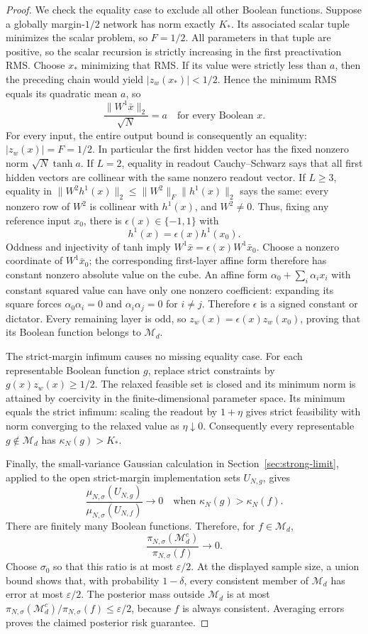 \begin{proof}
We check the equality case to exclude all other Boolean functions.
Suppose a globally margin-$1/2$ network has norm exactly $K_*$.
Its associated scalar tuple minimizes the scalar problem, so $F=1/2$.
All parameters in that tuple are positive, so the scalar recursion is strictly
increasing in the first preactivation RMS.
Choose $x_*$ minimizing that RMS. If its value were strictly less than $a$,
then the preceding chain would yield $|z_w(x_*)|<1/2$.
Hence the minimum RMS equals its quadratic mean $a$, so
\[
 \frac{\|W^1\bar x\|_2}{\sqrt N}=a
 \quad\text{for every Boolean }x.
\]
For every input, the entire output bound is consequently an equality:
$|z_w(x)|=F=1/2$. In particular the first hidden vector has the fixed nonzero
norm $\sqrt N\tanh a$.
If $L=2$, equality in readout Cauchy--Schwarz says that all first hidden
vectors are collinear with the same nonzero readout vector.
If $L\ge3$, equality in
$\|W^2h^1(x)\|_2\le\|W^2\|_F\|h^1(x)\|_2$ says the same: every nonzero row
of $W^2$ is collinear with $h^1(x)$, and $W^2\ne0$.
Thus, fixing any reference input $x_0$, there is
$\epsilon(x)\in\{-1,1\}$ with
\[
 h^1(x)=\epsilon(x)h^1(x_0).
\]
Oddness and injectivity of tanh imply
$W^1\bar x=\epsilon(x)W^1\bar x_0$.
Choose a nonzero coordinate of $W^1\bar x_0$; the corresponding first-layer
affine form therefore has constant nonzero absolute value on the cube.
An affine form $\alpha_0+\sum_i\alpha_i x_i$ with constant squared value can
have only one nonzero coefficient: expanding its square forces
$\alpha_0\alpha_i=0$ and $\alpha_i\alpha_j=0$ for $i\ne j$.
Therefore $\epsilon$ is a signed constant or dictator.
Every remaining layer is odd, so $z_w(x)=\epsilon(x)z_w(x_0)$, proving that
its Boolean function belongs to $\mathcal M_d$.

The strict-margin infimum causes no missing equality case.
For each representable Boolean function $g$, replace strict constraints by
$g(x)z_w(x)\ge1/2$. The relaxed feasible set is closed and its minimum norm
is attained by coercivity in the finite-dimensional parameter space.
Its minimum equals the strict infimum: scaling the readout by $1+\eta$ gives
strict feasibility with norm converging to the relaxed value as $\eta\downarrow0$.
Consequently every representable $g\notin\mathcal M_d$ has
$\kappa_N(g)>K_*$.

Finally, the small-variance Gaussian calculation in
Section~\ref{sec:strong-limit}, applied to the open strict-margin
implementation sets $U_{N,g}$, gives
\[
 \frac{\mu_{N,\sigma}(U_{N,g})}
      {\mu_{N,\sigma}(U_{N,f})}\longrightarrow0
 \quad\text{when }\kappa_N(g)>\kappa_N(f).
\]
There are finitely many Boolean functions. Therefore, for $f\in\mathcal M_d$,
\[
 \frac{\pi_{N,\sigma}(\mathcal M_d^c)}{\pi_{N,\sigma}(f)}\longrightarrow0.
\]
Choose $\sigma_0$ so that this ratio is at most $\varepsilon/2$.
At the displayed sample size, a union bound shows that, with probability
$1-\delta$, every consistent member of $\mathcal M_d$ has error at most
$\varepsilon/2$. The posterior mass outside $\mathcal M_d$ is at most
$\pi_{N,\sigma}(\mathcal M_d^c)/\pi_{N,\sigma}(f)\le\varepsilon/2$,
because $f$ is always consistent. Averaging errors proves the claimed
posterior risk guarantee.
\end{proof}

